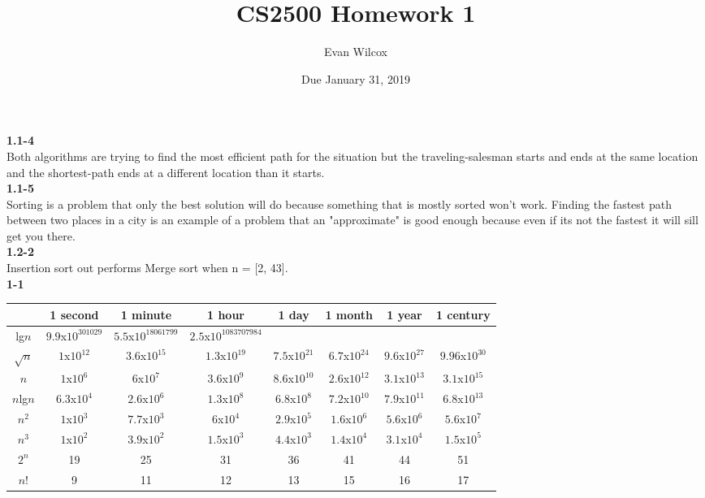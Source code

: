 \documentclass[a4paper]{article}
\title{CS2500 Homework 1}
\author{Evan Wilcox}
\date{Due January 31, 2019}
\begin{document}
    \maketitle

    \textbf{1.1-4}\\
    Both algorithms are trying to find the most efficient path for the situation 
    but the traveling-salesman starts and ends at the same location and the 
    shortest-path ends at a different location than it starts. \\
    
    \textbf{1.1-5}\\
    Sorting is a problem that only the best solution will do because something that 
    is mostly sorted won't work. Finding the fastest path between two places in a city 
    is an example of a problem that an "approximate" is good enough because even if its
    not the fastest it will sill get you there.\\
    
    \textbf{1.2-2}\\
    Insertion sort out performs Merge sort when n = [2, 43].\\

    \textbf{1-1}\\
    
    \begin{tabular}{ c|c|c|c|c|c|c|c| }
        
         & 1 second & 1 minute & 1 hour & 1 day & 1 month & 1 year & 1 century\\
        \hline
        lg$n$ & $9.9$x$10^{301029}$ & $5.5$x$10^{18061799}$ & $2.5$x$10^{1083707984}$ &  &  &  & \\
        \hline
        $\sqrt{n}$ & $1$x$10^{12}$ & $3.6$x$10^{15}$ & $1.3$x$10^{19}$ & $7.5$x$10^{21}$ & $6.7$x$10^{24}$ & $9.6$x$10^{27}$ & $9.96$x$10^{30}$\\
        \hline
        $n$ & $1$x$10^{6}$ & $6$x$10^{7}$ & $3.6$x$10^{9}$ & $8.6$x$10^{10}$ & $2.6$x$10^{12}$ & $3.1$x$10^{13}$ & $3.1$x$10^{15}$\\
        \hline
        $n$lg$n$ & $6.3$x$10^{4}$ & $2.6$x$10^{6}$ & $1.3$x$10^{8}$ & $6.8$x$10^{8}$ & $7.2$x$10^{10}$ & $7.9$x$10^{11}$ & $6.8$x$10^{13}$\\
        \hline
        $n^{2}$ & $1$x$10^{3}$ & $7.7$x$10^{3}$ & $6$x$10^{4}$ & $2.9$x$10^{5}$ & $1.6$x$10^{6}$ & $5.6$x$10^{6}$ & $5.6$x$10^{7}$\\
        \hline
        $n^{3}$ & $1$x$10^{2}$ & $3.9$x$10^{2}$ & $1.5$x$10^{3}$ & $4.4$x$10^{3}$ & $1.4$x$10^{4}$ & $3.1$x$10^{4}$ & $1.5$x$10^{5}$\\
        \hline
        $2^{n}$ & 19 & 25 & 31 & 36 & 41 & 44 & 51\\
        \hline
        $n!$ & 9 & 11 & 12 & 13 & 15 & 16 & 17\\
        \hline

    \end{tabular}\\
    
\end{document}
